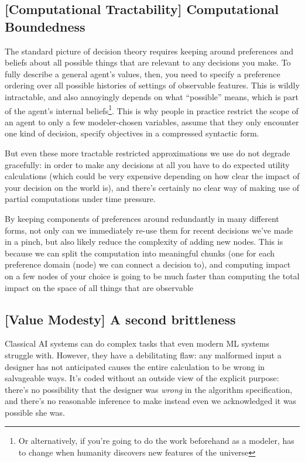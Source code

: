 \documentclass{article}
\begin{document}
	\subsection*{[Computational Tractability] Computational Boundedness}

	The standard picture of decision theory requires keeping around preferences and beliefs about all possible things that are relevant to any decisions you make. To fully describe a general agent's values, then, you need to specify a preference ordering over all possible histories of settings of observable features. This is wildly intractable, and also annoyingly depends on what ``possible'' means, which is part of the agent's internal beliefs\footnote{Or alternatively, if you're going to do the work beforehand as a modeler, has to change when humanity discovers new features of the universe}. This is why people in practice restrict the scope of an agent to only a few modeler-chosen variables, assume that they only encounter one kind of decision, specify objectives in a compressed syntactic form.
	
	But even these more tractable restricted approximations we use do not degrade gracefully: in order to make any decisions at all you have to do expected utility calculations (which could be very expensive depending on how clear the impact of your decision on the world is), and there's certainly no clear way of making use of partial computations under time pressure.
	
	{\color{green!30!black} By keeping components of preferences around redundantly in many different forms, not only can we immediately re-use them for recent decisions we've made in a pinch, but also likely reduce the complexity of adding new nodes. This is because we can split the computation into meaningful chunks (one for each preference domain (node) we can connect a decision to), and computing impact on a few nodes of your choice is going to be much faster than computing the total impact on the space of all things that are observable}
	
	\subsection*{[Value Modesty] A second brittleness}
	Classical AI systems can do complex tasks that even modern ML systems struggle with. However, they have a debilitating flaw: any malformed input a designer has not anticipated causes the entire calculation to be wrong in salvageable ways. It's coded without an outside view of the explicit purpose: there's no possibility that the designer was \textit{wrong} in the algorithm specification, and there's no reasonable inference to make instead even we acknowledged it was possible she was.
	
\end{document}
